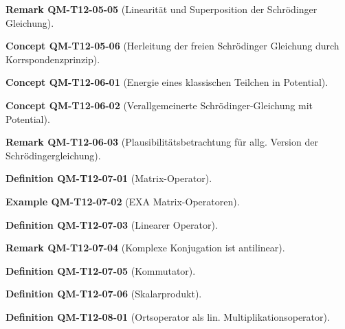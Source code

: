 \documentclass[10pt, letterpaper]{article}
\newcommand{\CustomHeading}[3]{%
  \par\medskip\noindent%
  \textbf{#1 #2} \textnormal{(#3)}.\enskip%
}
\newenvironment{DEF}[2]{\CustomHeading{Definition}{#1}{#2}}{}
\newenvironment{REM}[2]{\CustomHeading{Remark}{#1}{#2}}{}
\newenvironment{EXA}[2]{\CustomHeading{Example}{#1}{#2}}{}
\newenvironment{CONC}[2]{\CustomHeading{Concept}{#1}{#2}}{}
\begin{document}
\begin{REM}{QM-T12-05-05}{Linearität und Superposition der Schrödinger Gleichung}
\end{REM}

\begin{CONC}{QM-T12-05-06}{Herleitung der freien Schrödinger Gleichung durch Korrspondenzprinzip}
\end{CONC}

\begin{CONC}{QM-T12-06-01}{Energie eines klassischen Teilchen in Potential}
\end{CONC}

\begin{CONC}{QM-T12-06-02}{Verallgemeinerte Schrödinger-Gleichung mit Potential}
\end{CONC}

\begin{REM}{QM-T12-06-03}{Plausibilitätsbetrachtung für allg. Version der Schrödingergleichung}
\end{REM}

\begin{DEF}{QM-T12-07-01}{Matrix-Operator}
\end{DEF}

\begin{EXA}{QM-T12-07-02}{EXA Matrix-Operatoren}
\end{EXA}

\begin{DEF}{QM-T12-07-03}{Linearer Operator}
\end{DEF}

\begin{REM}{QM-T12-07-04}{Komplexe Konjugation ist antilinear}
\end{REM}

\begin{DEF}{QM-T12-07-05}{Kommutator}
\end{DEF}

\begin{DEF}{QM-T12-07-06}{Skalarprodukt}
\end{DEF}

\begin{DEF}{QM-T12-08-01}{Ortsoperator als lin. Multiplikationsoperator}
\end{DEF}
\end{document}
